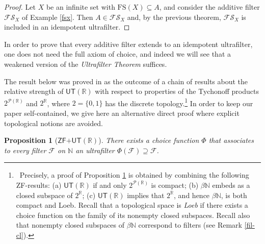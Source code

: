 \documentclass{amsart}
\newtheorem{proposition}[theorem]{Proposition}
\theoremstyle{definition}
\theoremstyle{remark}
\def\F{\mathscr{F}}
\def\N{\mathbb{N}}
\def\R{\mathbb{R}}
\begin{document}
\begin{proof}
Let $X$ be an infinite set
with $\text{FS}(X)\subseteq A$, and consider
the additive filter $\mathcal{FS}_X$ of Example \ref{fsx}.
Then $A\in\mathcal{FS}_X$ and, by the previous theorem, 
$\mathcal{FS}_X$ is included in an idempotent ultrafilter.
\end{proof}

In order to prove that every additive filter extends to an
idempotent ultrafilter, one does not need the full
axiom of choice, and indeed we will see that a weakened version
of the \emph{Ultrafilter Theorem} suffices. 

The result below was proved 
in \cite[Lemma 4(ii)]{hkt} as the outcome of a chain of results about
the relative strength of $\textsf{UT}(\R)$ with respect
to properties of the Tychonoff
products $2^{\mathcal{P}(\R)}$ and
$2^\R$, where $2=\{0,1\}$ has the discrete topology.\footnote
{~Precisely, a proof of Proposition \ref{bpi} is obtained by combining the 
following \textsf{ZF}-results: (a) $\textsf{UT}(\R)$ if and only 
$2^{\mathcal{P}(\R)}$ is compact; 
(b) $\beta\N$ embeds as a closed subspace of 
$2^{\R}$; (c) $\textsf{UT}(\R)$ implies that 
$2^\R$, and hence $\beta\N$, is both compact and Loeb.
Recall that a topological space is \emph{Loeb} if there exists
a choice function on the family of its nonempty closed subspaces.
Recall also that nonempty closed subspaces of $\beta\N$ correspond to filters
(see Remark \ref{fil-cl}).}
In order to keep our paper self-contained, we give here
an alternative direct proof where explicit topological
notions are avoided.


\begin{proposition}[$\textsf{ZF+UT}(\R)$]\label{bpi}
There exists a choice function $\Phi$ that
associates to every filter $\F$ on $\N$
an ultrafilter $\Phi(\F)\supseteq\F$.
\end{proposition}
\end{document}
